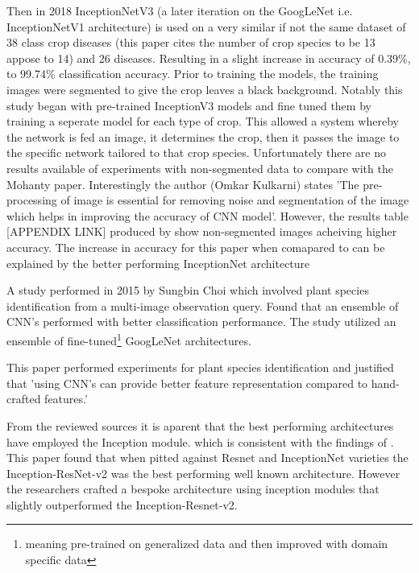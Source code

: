   \par
  Then in 2018 InceptionNetV3 (a later iteration on the GoogLeNet i.e. InceptionNetV1 architecture) is used on a very similar if not the same dataset of 38 class crop diseases (this paper cites the number of crop species to be 13 appose to 14) and 26 diseases. Resulting in a slight increase in accuracy of 0.39\%, to 99.74\% classification accuracy. \cite{Kulkarni2018} %
  Prior to training the models, the training images were segmented to give the crop leaves a black background.
  Notably this study began with pre-trained InceptionV3 models and fine tuned them by training a seperate model for each type of crop. This allowed a system whereby the network is fed an image, it determines the crop, then it passes the image to the specific network tailored to that crop species.
  Unfortunately there are no results available of experiments with non-segmented data to compare with the Mohanty paper. Interestingly the author (Omkar Kulkarni) states 'The pre-processing of image is essential for removing noise and segmentation of the image which helps in improving the accuracy of CNN model'. However, the results table [APPENDIX LINK] produced by \cite{Mohanty2016} show non-segmented images acheiving higher accuracy. The increase in accuracy for this paper when comapared to \cite{Mohanty2016} can be explained by the better performing InceptionNet architecture %
  \par
  A study performed in 2015 by Sungbin Choi \cite{Choi} which involved plant species identification from a multi-image observation query. Found that an ensemble of CNN's performed with better classification performance. The study utilized an ensemble of fine-tuned\footnote[2]{meaning pre-trained on generalized data and then improved with domain specific data} GoogLeNet architectures.
  \par
  This paper \cite{Zhu2018} performed experiments for plant species identification and justified that 'using CNN's can provide better feature representation compared to hand-crafted features.' %
  \par
  From the reviewed sources it is aparent that the best performing architectures have employed the Inception \cite{Szegedy2015} module.
  which is consistent with the findings of \cite{Wu2019}. This paper found that when pitted against Resnet %
   \cite{He} and InceptionNet varieties the Inception-ResNet-v2 was the best performing well known architecture. However the researchers crafted a bespoke architecture using inception modules that slightly outperformed the Inception-Resnet-v2. %
